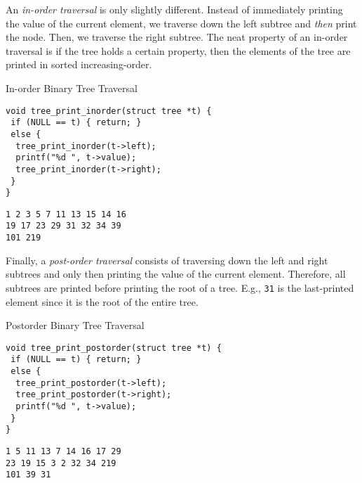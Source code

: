 An \textit{in-order traversal} is only slightly different. Instead of immediately printing the value of the current element, we traverse down the left subtree and \textit{then} print the node. Then, we traverse the right subtree. The neat property of an in-order traversal is if the tree holds a certain property, then the elements of the tree are printed in sorted increasing-order.

\begin{clo}[main.c]{In-order Binary Tree Traversal}\begin{lstlisting}[language=MyC]
void tree_print_inorder(struct tree *t) {
 if (NULL == t) { return; }
 else {
  tree_print_inorder(t->left);
  printf("%d ", t->value);
  tree_print_inorder(t->right);
 }
}
\end{lstlisting}
\tcblower
\begin{lstlisting}[language=MyOutput]
1 2 3 5 7 11 13 15 14 16 
19 17 23 29 31 32 34 39 
101 219
\end{lstlisting}
\end{clo}

Finally, a \textit{post-order traversal} consists of traversing down the left and right subtrees and only then printing the value of the current element. Therefore, all subtrees are printed before printing the root of a tree. E.g., \texttt{31} is the last-printed element since it is the root of the entire tree.

\begin{clo}[main.c]{Postorder Binary Tree Traversal}\begin{lstlisting}[language=MyC]
void tree_print_postorder(struct tree *t) {
 if (NULL == t) { return; }
 else {
  tree_print_postorder(t->left);
  tree_print_postorder(t->right);
  printf("%d ", t->value);
 }
}
\end{lstlisting}
\tcblower
\begin{lstlisting}[language=MyOutput]
1 5 11 13 7 14 16 17 29 
23 19 15 3 2 32 34 219 
101 39 31
\end{lstlisting}
\end{clo}




